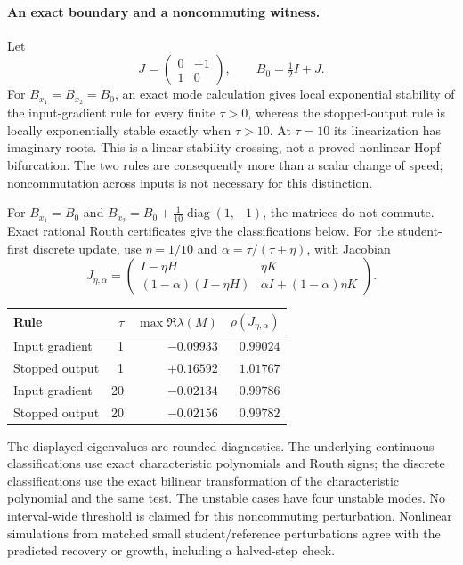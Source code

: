 \documentclass[11pt,a4paper]{article}
\begin{document}
\paragraph{An exact boundary and a noncommuting witness.}
Let
\[
 J=\begin{pmatrix}0&-1\\1&0\end{pmatrix},\qquad B_0=\tfrac12 I+J.
\]
For $B_{x_1}=B_{x_2}=B_0$, an exact mode calculation gives local
exponential stability of the input-gradient rule for every finite
$\tau>0$, whereas the stopped-output rule is locally exponentially
stable exactly when $\tau>10$. At $\tau=10$ its linearization has
imaginary roots. This is a linear stability crossing, not a proved
nonlinear Hopf bifurcation. The two rules are consequently more than
a scalar change of speed; noncommutation across inputs is not necessary
for this distinction.

For $B_{x_1}=B_0$ and $B_{x_2}=B_0+\tfrac1{10}\operatorname{diag}(1,-1)$,
the matrices do not commute. Exact rational Routh certificates give the
classifications below. For the student-first discrete update, use
$\eta=1/10$ and $\alpha=\tau/(\tau+\eta)$, with Jacobian
\begin{equation}
 J_{\eta,\alpha}=\begin{pmatrix}
 I-\eta H&\eta K\\
 (1-\alpha)(I-\eta H)&\alpha I+(1-\alpha)\eta K
 \end{pmatrix}.
 \label{eq:discreteblock}
\end{equation}
\begin{center}
\begin{tabular}{lrrr}
Rule & $\tau$ & $\max\Re\lambda(M)$ & $\rho(J_{\eta,\alpha})$\\ \hline
Input gradient & 1 & $-0.09933$ & $0.99024$\\
Stopped output & 1 & $+0.16592$ & $1.01767$\\
Input gradient & 20 & $-0.02134$ & $0.99786$\\
Stopped output & 20 & $-0.02156$ & $0.99782$
\end{tabular}
\end{center}
The displayed eigenvalues are rounded diagnostics. The underlying
continuous classifications use exact characteristic polynomials and
Routh signs; the discrete classifications use the exact bilinear
transformation of the characteristic polynomial and the same test.
The unstable cases have four unstable modes. No interval-wide threshold
is claimed for this noncommuting perturbation. Nonlinear simulations
from matched small student/reference perturbations agree with the
predicted recovery or growth, including a halved-step check.
\end{document}
